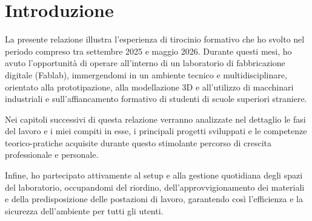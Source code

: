 %
\section{Introduzione}
La presente relazione illustra l'esperienza di tirocinio formativo che ho svolto nel periodo compreso tra settembre 2025 e maggio 2026. Durante questi mesi, ho avuto l'opportunità di operare all'interno di un laboratorio di fabbricazione digitale (Fablab), immergendomi in un ambiente tecnico e multidisciplinare, orientato alla prototipazione, alla modellazione 3D e all'utilizzo di macchinari industriali e sull'affiancamento formativo di studenti di scuole superiori straniere.

Nei capitoli successivi di questa relazione verranno analizzate nel dettaglio le fasi del lavoro e i miei compiti in esse, i principali progetti sviluppati e le competenze teorico-pratiche acquisite durante questo stimolante percorso di crescita professionale e personale.

Infine, ho partecipato attivamente al setup e alla gestione quotidiana degli spazi del laboratorio, occupandomi del riordino, dell'approvvigionamento dei materiali e della predisposizione delle postazioni di lavoro, garantendo così l'efficienza e la sicurezza dell'ambiente per tutti gli utenti.

